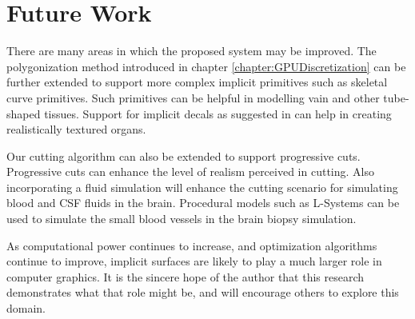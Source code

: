 \section{Future Work}
There are many areas in which the proposed system may be improved. The polygonization method 
introduced in chapter \ref{chapter:GPUDiscretization} can be further extended to support more 
complex implicit primitives such as skeletal curve primitives. Such primitives can be helpful in modelling 
vain and other tube-shaped tissues. Support for implicit decals as suggested in \cite{DeGroot2014} can help 
in creating realistically textured organs. 

Our cutting algorithm can also be extended to support progressive cuts. Progressive cuts can 
enhance the level of realism perceived in cutting. Also incorporating a fluid simulation will enhance the cutting 
scenario for simulating blood and CSF fluids in the brain. Procedural models such as L-Systems can be 
used to simulate the small blood vessels in the brain biopsy simulation. 

As computational power continues to increase, and optimization algorithms continue to improve, implicit 
surfaces are likely to play a much larger role in computer graphics. It is the sincere hope of the author 
that this research demonstrates what that role might be, and will encourage others to explore this domain.



